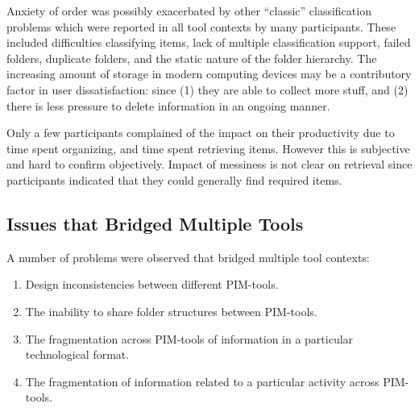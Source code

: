 Anxiety of order was possibly exacerbated by other ``classic'' classification problems which were reported in all tool contexts by many participants.  These included difficulties classifying items, lack of multiple classification support, failed folders, duplicate folders, and the static nature of the folder hierarchy.  The increasing amount of storage in modern computing devices may be a contributory factor in user dissatisfaction: since (1) they are able to collect more stuff, and (2) there is less pressure to delete information in an ongoing manner.

Only a few participants complained of the impact on their productivity due to time spent organizing, and time spent retrieving items.  However this is subjective and hard to confirm objectively.  Impact of messiness is not clear on retrieval since participants indicated that they could generally find required items. 





\subsection{Issues that Bridged Multiple Tools}
\label{exp-study:issues-cross-tool}

A number of problems were observed that bridged multiple tool contexts:
\begin{enumerate}
\item Design inconsistencies between different PIM-tools.
\item The inability to share folder structures between PIM-tools.
\item The fragmentation across PIM-tools of information in a particular technological format.
\item The fragmentation of information related to a particular activity across PIM-tools.
\end{enumerate}

